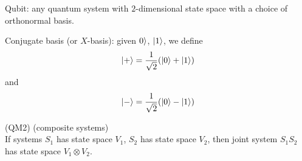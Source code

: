 \documentclass[a4paper]{article}
\begin{document}
Qubit: any quantum system with $2$-dimensional state space with a choice of orthonormal basis.

Conjugate basis (or $X$-basis): given $0\rangle$, $|1\rangle$, we define $$|+\rangle = \frac{1}{\sqrt{2}} (|0\rangle+|1\rangle)$$ and $$|-\rangle = \frac{1}{\sqrt{2}}(|0\rangle-|1\rangle)$$

(QM2) (composite systems)\\
If systems $S_1$ has state space $V_1$, $S_2$ has state space $V_2$, then joint system $S_1S_2$ has state space $V_1 \otimes V_2$.



\iffalse
\begin{equation*}
\begin{aligned}

\end{aligned}
\end{equation*}
\fi
\end{document}
